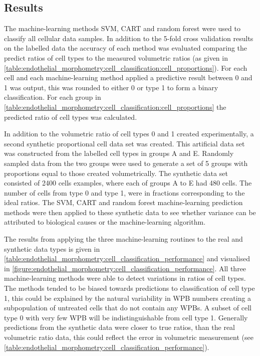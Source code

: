 \subsection{Results}
The machine-learning methods SVM, CART and random forest were used to classify all cellular data samples. In addition to the 5-fold cross validation results on the labelled data the accuracy of each method was evaluated comparing the predict ratios of cell types to the measured volumetric ratios (as given in \autoref{table:endothelial_morphometry:cell_classification:cell_proportions}). For each cell and each machine-learning method applied a predictive result between 0 and 1 was output, this was rounded to either 0 or type 1 to form a binary classification. For each group in \autoref{table:endothelial_morphometry:cell_classification:cell_proportions} the predicted ratio of cell types was calculated.

In addition to the volumetric ratio of cell types 0 and 1 created experimentally, a second synthetic proportional cell data set was created. This artificial data set was constructed from the labelled cell types in groups A and E. Randomly sampled data from the two groups were used to generate a set of 5 groups with proportions equal to those created volumetrically. The synthetic data set consisted of 2400 cells examples, where each of groups A to E had 480 cells. The number of cells from type 0 and type 1, were in fractions corresponding to the ideal ratios. The SVM, CART and random forest machine-learning prediction methods were then applied to these synthetic data to see whether variance can be attributed to biological causes or the machine-learning algorithm.

The results from applying the three machine-learning routines to the real and synthetic data types is given in \autoref{table:endothelial_morphometry:cell_classification_performance} and visualised in \autoref{figure:endothelial_morphometry:cell_classification_performance}. All three machine-learning methods were able to detect variations in ratios of cell types. The methods tended to be biased towards predictions to classification of cell type 1, this could be explained by the natural variability in WPB numbers creating a subpopulation of untreated cells that do not contain any WPBs. A subset of cell type 0 with very few WPB will be indistinguishable from cell type 1. Generally predictions from the synthetic data were closer to true ratios, than the real volumetric ratio data, this could reflect the error in volumetric measurement (see \autoref{table:endothelial_morphometry:cell_classification_performance}).

